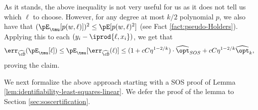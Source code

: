 As it stands, the above inequality is not very useful for us as it does not tell us which $\ell$ to choose. However, for any degree at most $k/2$ polynomial $p$, we also have that $(\pE_{\tmu}[ p(w,\ell)])^2 \leq \pE[p(w,\ell)^2] $ (see Fact \ref{fact:pseudo-Holders}). Applying this to each $(y_i - \iprod{\ell,x_i})$, we get that
$$\err_{\widehat{\cD}} (\pE_{\tmu}[\ell]) \leq \pE_{\tmu}[ \err_{\widehat{\cD}}(\ell)]  \leq (1 + c C \eta^{1-2/k}) \cdot \widehat{\opt}_{SOS} + c C \eta^{1-2/k} \widehat{\opt}_k,$$
proving the claim. 

We next formalize the above approach starting with a SOS proof of Lemma \ref{lem:identifiability-least-squares-linear}. We defer the proof of the lemma to Section \ref{sec:soscertification}. 





